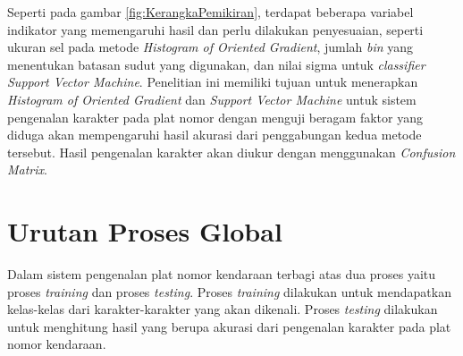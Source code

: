 \begin{adjustbox}{width=1\textwidth}
	\noindent\begin{minipage}{\linewidth}
	\label{fig:KerangkaPemikiran}
\end{minipage}
\end{adjustbox}

\noindent Seperti pada gambar \ref{fig:KerangkaPemikiran}, terdapat beberapa variabel indikator yang memengaruhi hasil dan perlu dilakukan penyesuaian, seperti ukuran sel pada metode \textit{Histogram of Oriented Gradient}, jumlah \textit{bin} yang menentukan batasan sudut yang digunakan, dan nilai sigma untuk \textit{classifier} \textit{Support Vector Machine}. Penelitian ini memiliki tujuan untuk menerapkan \textit{Histogram of Oriented Gradient} dan \textit{Support Vector Machine} untuk sistem pengenalan karakter pada plat nomor dengan menguji beragam faktor yang diduga akan mempengaruhi hasil akurasi dari penggabungan kedua metode tersebut. Hasil pengenalan karakter akan diukur dengan menggunakan \textit{Confusion Matrix}.\\

\section{Urutan Proses Global}
\noindent Dalam sistem pengenalan plat nomor kendaraan terbagi atas dua proses yaitu proses \textit{training} dan proses \textit{testing}. Proses \textit{training} dilakukan untuk mendapatkan kelas-kelas dari karakter-karakter yang akan dikenali. Proses \textit{testing} dilakukan untuk menghitung hasil yang berupa akurasi dari pengenalan karakter pada plat nomor kendaraan.\\

